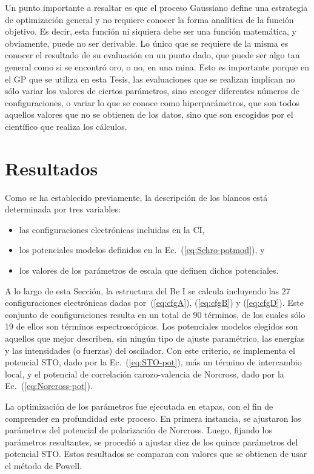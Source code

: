 Un punto importante a resaltar es que el proceso Gaussiano define una 
estrategia de optimización general y no requiere conocer la forma
analítica de la función objetivo. Es decir, esta función ni siquiera 
debe ser una función matemática, y obviamente, puede no ser derivable. 
Lo único que se requiere de la misma es conocer el resultado de su 
evaluación en un punto dado, que puede ser algo tan general como si se 
encontró oro, o no, en una mina. Esto es importante porque en el GP que 
se utiliza en esta Tesis, las evaluaciones que se realizan implican no 
sólo variar los valores de ciertos parámetros, sino escoger diferentes 
números de configuraciones, o variar lo que se conoce como 
hiperparámetros, que son todos aquellos valores que no se obtienen de 
los datos, sino que son escogidos por el científico que realiza los 
cálculos.

\section{Resultados}
\label{sec:results-rmatrix}

Como se ha establecido previamente, la descripción de los blancos está 
determinada por tres variables:
\begin{itemize}
\item las configuraciones electrónicas incluidas en la CI,
\item los potenciales modelos definidos en la 
Ec.~(\ref{eq:Schro-potmod}), y 
\item los valores de los parámetros de escala que definen dichos 
potenciales.
\end{itemize}
A lo largo de esta Sección, la estructura del Be I se calcula incluyendo
las 27 configuraciones electrónicas dadas por~(\ref{eq:cfgA}), 
(\ref{eq:cfgB}) y (\ref{eq:cfgD}). Este conjunto de configuraciones 
resulta en un total de 90 términos, de los cuales sólo 19 de ellos son 
términos espectroscópicos. Los potenciales modelos elegidos son 
aquellos que mejor describen, sin ningún tipo de ajuste paramétrico, las 
energías y las intensidades (o fuerzas) del oscilador. Con este criterio, 
se implementa el potencial STO, dado por la Ec.~(\ref{eq:STO-pot}), más 
un término de intercambio local, y el potencial de correlación 
carozo-valencia de Norcross, dado por la Ec.~(\ref{eq:Norcross-pot}).

La optimización de los parámetros fue ejecutada en etapas, con el fin de 
comprender en profundidad este proceso. En primera instancia, se 
ajustaron los parámetros del potencial de polarización de Norcross. 
Luego, fijando los parámetros resultantes, se procedió a ajustar diez de 
los quince parámetros del potencial STO. Estos resultados se comparan 
con valores que se obtienen de usar el método de Powell. 

